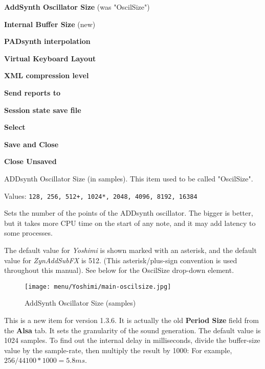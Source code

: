    \begin{enumber}
      \item \textbf{AddSynth Oscillator Size} (was "OscilSize")
      \item \textbf{Internal Buffer Size} (new)
      \item \textbf{PADsynth interpolation}
      \item \textbf{Virtual Keyboard Layout}
      \item \textbf{XML compression level}
      \item \textbf{Send reports to}
      \item \textbf{Session state save file}
      \item \textbf{Select}
      \item \textbf{Save and Close}
      \item \textbf{Close Unsaved}
   \end{enumber}

   \setcounter{ItemCounter}{0}      %

   ADDsynth Oscillator Size (in samples).  This item used to be called
   "OscilSize".

   Values: \texttt{128, 256, 512+, 1024*, 2048, 4096, 8192, 16384}

   Sets the number of the points of the ADDsynth oscillator. The
   bigger is better, but it takes more CPU time on the start of any note,
   and it may add latency to some processes.

   The default value for \textsl{Yoshimi} is shown marked with an asterisk,
   and the default value for \textsl{ZynAddSubFX} is 512.
   (This asterisk/plus-sign convention is used throughout this manual).
   See  below for the OscilSize
   drop-down element.

\begin{figure}[H]
   \centering 
   \texttt{[image: menu/Yoshimi/main-oscilsize.jpg]}
   \caption[OscilSize Values]{AddSynth Oscillator Size (samples)}
   \label{fig:yoshimi_oscilsize_values}
\end{figure}

   This is a new item for version 1.3.6.  It is actually the old
   \textbf{Period Size} field from the \textbf{Alsa} tab.
   It sets the granularity of the sound generation.
   The default value is 1024 samples.
   To find out the internal delay in milliseconds, divide the
   buffer-size value by the sample-rate, then multiply the result by 1000:
   For example, \(256 / 44100 * 1000 = 5.8 ms\).

